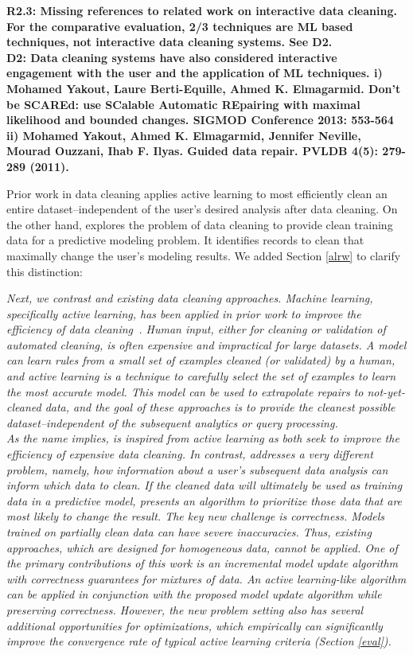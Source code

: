 \vspace{0.5em}

\noindent\textbf{R2.3: Missing references to related work on interactive data cleaning. For the comparative evaluation, 2/3 techniques are ML based techniques, not interactive data cleaning systems. See D2.\\
D2: Data cleaning systems have also considered interactive engagement with the user and the application of ML techniques. 
i) Mohamed Yakout, Laure Berti-Equille, Ahmed K. Elmagarmid. Don't be SCAREd: use SCalable Automatic REpairing with maximal likelihood and bounded changes. SIGMOD Conference 2013: 553-564
ii) Mohamed Yakout, Ahmed K. Elmagarmid, Jennifer Neville, Mourad Ouzzani, Ihab F. Ilyas.
Guided data repair. PVLDB 4(5): 279-289 (2011).
}

Prior work in data cleaning applies active learning to most efficiently clean an entire dataset--independent of the user's desired analysis after data cleaning.
On the other hand, \sys explores the problem of data cleaning to provide clean training data for a predictive modeling problem.
It identifies records to clean that maximally change the user's modeling results.
We added Section \ref{alrw} to clarify this distinction:

\emph{Next, we contrast \sys and existing data cleaning approaches.
Machine learning, specifically active learning, has been applied in prior work to improve the efficiency of data cleaning~\cite{yakout2013don,DBLP:journals/pvldb/YakoutENOI11,gokhale2014corleone}.
Human input, either for cleaning or validation of automated cleaning, is often expensive and impractical for large datasets.
A model can learn rules from a small set of examples cleaned (or validated) by a human, and active learning is a technique to carefully select the set of examples to learn the most accurate model.
This model can be used to extrapolate repairs to not-yet-cleaned data, and the goal of these approaches is to provide the cleanest possible dataset--independent of the subsequent analytics or query processing.\\
As the name implies, \sys is inspired from active learning as both seek to improve the efficiency of expensive data cleaning.
In contrast, \sys addresses a very different problem, namely, how information about a user's subsequent data analysis can inform which data to clean.
If the cleaned data will ultimately be used as training data in a predictive model, \sys presents an algorithm to prioritize those data that are most likely to change the result.
The key new challenge is correctness.
Models trained on partially clean data can have severe inaccuracies.
Thus, existing approaches, which are designed for homogeneous data, cannot be applied.
One of the primary contributions of this work is an incremental model update algorithm with correctness guarantees for mixtures of data.
An active learning-like algorithm can be applied in conjunction with the proposed model update algorithm while preserving correctness.
However, the new problem setting also has several additional opportunities for optimizations, which empirically can significantly improve the convergence rate of typical active learning criteria (Section \ref{eval}).}


